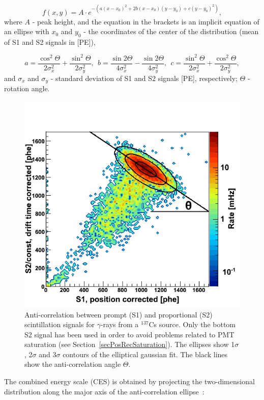\begin{equation}
f(x,y) = A \cdot e^{-(a(x-x_{0})^{2} + 2b(x-x_{0})(y-y_{0}) + c(y-y_{0})^{2})},
\end{equation}
where $A$ - peak height, and the equation in the brackets is an implicit equation of an ellipse with $x_{0}$ and $y_{0}$ - the coordinates of the center of the distribution (mean of S1 and S2 signals in [PE]),

\begin{equation}
\nonumber
a = \frac{\cos^2{\Theta}}{2\sigma^{2}_{x}} + \frac{\sin^2{\Theta}}{2\sigma^{2}_{y}}, \ \
b = \frac{\sin{2\Theta}}{4\sigma^{2}_{x}}-\frac{\sin{2\Theta}}{4\sigma^{2}_{y}}, \ \
c = \frac{\sin^2{\Theta}}{2\sigma^{2}_{x}}+\frac{\cos^2{\Theta}}{2\sigma^{2}_{y}},
\end{equation}
and 
$\sigma_{x}$ and $\sigma_{y}$ - standard deviation of S1 and S2 signals [PE], respectively; $\Theta$ - rotation angle.


\begin{figure}[!h]
\centering
\includegraphics[height=0.4\linewidth]{plots/CES/662keV_const200_withFits_withLabels.png}
\caption[Anti-correlation between prompt (S1) and proportional (S2) scintillation signals for $\gamma$-rays from a $^{137}$Cs source]{Anti-correlation between prompt (S1) and proportional (S2) scintillation signals for $\gamma$-rays from a $^{137}$Cs source. Only the bottom S2 signal has been used in order to avoid problems related to PMT saturation (see Section~\ref{secPosRecSaturation}). The ellipses show 1$\sigma$, 2$\sigma$ and 3$\sigma$ contours of the elliptical gaussian fit. The black lines show the  anti-correlation angle $\Theta$.}
\label{figCES_S2vsS1_Cs137}
\end{figure}


The combined energy scale (CES) is obtained by projecting the two-dimensional distribution along the major axis of the anti-correlation ellipse~\cite{CES_Aprile}:

